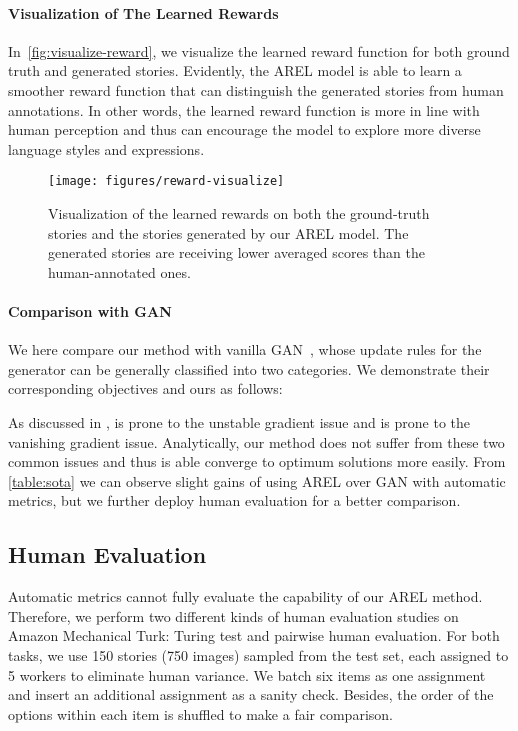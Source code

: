 \documentclass[11pt,a4paper]{article}
\begin{document}
\paragraph{Visualization of The Learned Rewards}
In~\autoref{fig:visualize-reward}, we visualize the learned reward function for both ground truth and generated stories. Evidently, the AREL model is able to learn a smoother reward function that can distinguish the generated stories from human annotations. In other words, the learned reward function is more in line with human perception and thus can encourage the model to explore more diverse language styles and expressions.   

\begin{figure}
\centering
\texttt{[image: figures/reward-visualize]}  
\vspace*{-1ex}
\caption{Visualization of the learned rewards on both the ground-truth stories and the stories generated by our AREL model. The generated stories are receiving lower averaged scores than the human-annotated ones.}
\label{fig:visualize-reward}
\end{figure}

\paragraph{Comparison with GAN}
We here compare our method with vanilla GAN~\cite{goodfellow2014generative}, whose update rules for the generator can be generally classified into two categories. We demonstrate their corresponding objectives and ours as follows:

As discussed in \citet{arjovsky2017wasserstein},  is prone to the unstable gradient issue and  is prone to the vanishing gradient issue. Analytically, our method does not suffer from these two common issues and thus is able converge to optimum solutions more easily. From \autoref{table:sota} we can observe slight gains of using AREL over GAN with automatic metrics, but we further deploy human evaluation for a better comparison. 

\subsection{Human Evaluation}
\label{sec:human}
Automatic metrics cannot fully evaluate the capability of our AREL method. Therefore, we perform two different kinds of human evaluation studies on Amazon Mechanical Turk: Turing test and pairwise human evaluation. For both tasks, we use 150 stories (750 images) sampled from the test set, each assigned to 5 workers to eliminate human variance. We batch six items as one assignment and insert an additional assignment as a sanity check. Besides, the order of the options within each item is shuffled to make a fair comparison.
\end{document}
